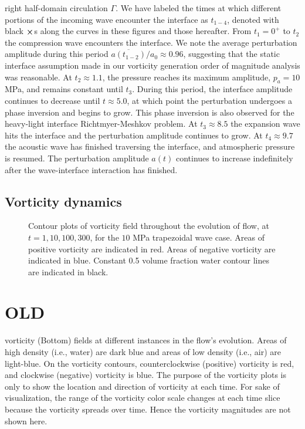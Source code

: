 right half-domain circulation $\Gamma$. We have labeled the times at
which different portions of the incoming wave encounter the interface
as $t_{1-4}$, denoted with black $\boldsymbol{\times}$s along the curves in
these figures and those hereafter. From $t_1=0^+$ to $t_2$ the
compression wave encounters the interface. We note the average
perturbation amplitude during this period
$\overline{a(t_{1-2})}/a_0\approx0.96$, suggesting that the static
interface assumption made in our vorticity generation order of
magnitude analysis was reasonable. At $t_2\approx1.1$, the pressure
reaches its maximum amplitude, $p_a=10$ MPa, and remains constant
until $t_3$. During this period, the interface amplitude continues to
decrease until $t\approx 5.0$, at which point the perturbation
undergoes a phase inversion and begins to grow. This phase inversion
is also observed for the heavy-light interface Richtmyer-Meshkov
problem. At $t_3\approx8.5$ the expansion wave hits the interface and
the perturbation amplitude continues to grow. At $t_4\approx9.7$ the
acoustic wave has finished traversing the interface, and atmospheric
pressure is resumed. The perturbation amplitude $a(t)$ continues to
increase indefinitely after the wave-interface interaction has
finished.



%
\subsection{Vorticity dynamics}
\begin{figure}[h] 
  \centering
  \caption[The evolution of the vorticity] {Contour plots of vorticity
    field throughout the evolution of flow, at
    $t=1, 10, 100, 300$, for the $10$ MPa trapezoidal wave case. Areas
    of positive vorticity are indicated in red. Areas of negative
    vorticity are indicated in blue. Constant 0.5 volume fraction
    water contour lines are indicated in black.}
  \label{fig:interface_snapshots}
\end{figure}





\section{OLD}

 vorticity (Bottom) fields at different instances in
the flow's evolution. Areas of high density (i.e., water) are dark
blue and areas of low density (i.e., air) are light-blue. On the
vorticity contours, counterclockwise (positive) vorticity is red, and
clockwise (negative) vorticity is blue. The purpose of the vorticity
plots is only to show the location and direction of vorticity at each
time. For sake of visualization, the range of the vorticity color
scale changes at each time slice because the vorticity spreads over
time. Hence the vorticity magnitudes are not shown here.  

